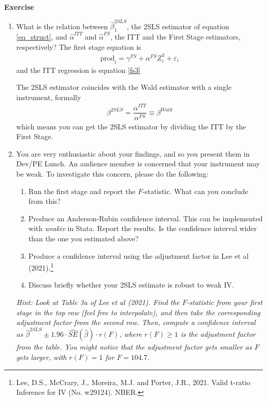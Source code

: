 \documentclass[10pt]{article}
\newcounter{exercise}
\newenvironment{exercise}%
{%
	\refstepcounter{exercise}%
	\textbf{Exercise \theexercise}%
	}%
{
 \par\vspace{\baselineskip}%
\noindent\ignorespacesafterend
}
\begin{document}
\begin{exercise}
\begin{enumerate}
		This table shows the 2SLS estimate. We see that the coefficient is 0.235, and is highly significant. The 95\% confidence interval is $[0.106,0.365]$.
		
		
			
		\color{black}
		\item What is the relation between $ \hat{\beta}_{1}^{2SLS} $, the 2SLS estimator of equation \ref{eq_struct}, and $ \hat{\alpha}^{ITT} $ and $ \hat{\alpha}^{FS} $, the ITT and the First Stage estimators, respectively?
		\color{red}
		The first stage equation is 
		\begin{align}\label{fs3}
		\text{prod}_{i} = \gamma^{FS} + \alpha^{FS}  Z^{3}_i + \varepsilon_{i}
		\end{align}
		and the ITT regression is equation \ref{fs3}
		
		The 2SLS estimator coincides with the Wald estimator with a single instrument, formally
		\begin{align*}
		 \beta^{2SLS} = \dfrac{\alpha^{ITT}}{\alpha^{FS}} \equiv \beta^{Wald}
		\end{align*}
		which means you can get the 2SLS estimator by dividing the ITT by the First Stage.
		
		\color{black}
	
		\item You are very enthusiastic about your findings, and so you present them in Dev/PE Lunch. An audience member is concerned that your instrument may be weak. To investigate this concern, please do the following:
	\begin{enumerate}
		\item Run the first stage and report the $F$-statistic. What can you conclude from this?
		\item Produce an Anderson-Rubin confidence interval. This can be implemented with \textit{weakiv} in Stata. Report the results. Is the confidence interval wider than the one you estimated above?
		\item Produce a confidence interval using the adjustment factor in Lee et al (2021).\footnote{Lee, D.S., McCrary, J., Moreira, M.J. and Porter, J.R., 2021. Valid t-ratio Inference for IV (No. w29124). NBER.} 
		\item Discuss briefly whether your 2SLS estimate is robust to weak IV.
	\end{enumerate}
	
	\textit{Hint: Look at Table 3a of Lee et al (2021). Find the $F$-statistic from your first stage in the top row (feel free to interpolate), and then take the corresponding adjustment factor from the second row. Then, compute a confidence interval as $\hat{\beta}^{2SLS} \pm 1.96 \cdot \widehat{SE}(\hat{\beta}) \cdot r(F)$, where $r(F) \geq 1$ is the adjustment factor from the table. You might notice that the adjustment factor gets smaller as $F$ gets larger, with $r(F)=1$ for $F=104.7$.}
	

\end{enumerate}
\end{exercise}
\end{document}
